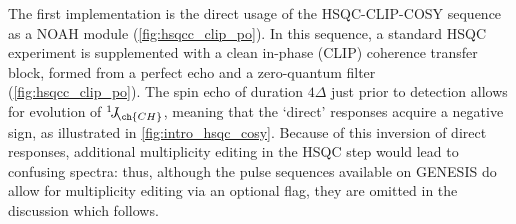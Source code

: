 \documentclass[a4paper,12pt]{article}
\newcommand{\oneJ}[1]{{}^{1}\!J_{\!\ch{#1}}}
\begin{document}
\begin{refsection}
The first implementation is the direct usage of the HSQC-CLIP-COSY sequence as a NOAH module (\cref{fig:hsqcc_clip_po}).
In this sequence, a standard HSQC experiment is supplemented with a clean in-phase (CLIP) coherence transfer block, formed from a perfect echo\autocite{Aguilar2012CC,Parella2019MRC,Koos2016ACIE} and a zero-quantum filter\autocite{Thrippleton2003ACIE} (\cref{fig:hsqcc_clip_po}).
The spin echo of duration $4\Delta$ just prior to detection allows for evolution of $\oneJ{CH}$, meaning that the `direct' responses acquire a negative sign, as illustrated in \cref{fig:intro_hsqc_cosy}.
Because of this inversion of direct responses, additional multiplicity editing in the HSQC step would lead to confusing spectra: thus, although the pulse sequences available on GENESIS do allow for multiplicity editing via an optional flag, they are omitted in the discussion which follows.


\end{refsection}
\end{document}

